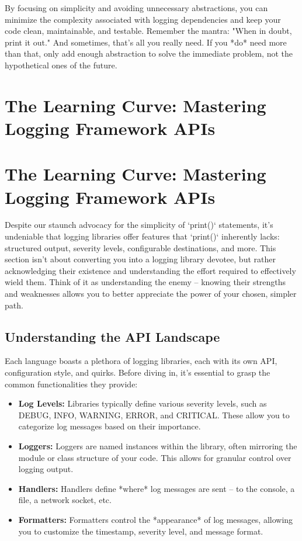 \documentclass{article}
\begin{document}
{{{{By focusing on simplicity and avoiding unnecessary abstractions, you can minimize the complexity associated with logging dependencies and keep your code clean, maintainable, and testable. Remember the mantra: "When in doubt, print it out." And sometimes, that's all you really need. If you *do* need more than that, only add enough abstraction to solve the immediate problem, not the hypothetical ones of the future.

\newpage

\section*{The Learning Curve: Mastering Logging Framework APIs} %
\label{chapter-7-5-The_Learning_Curve__Mastering_Logging_Fr}

\section*{The Learning Curve: Mastering Logging Framework APIs}

Despite our staunch advocacy for the simplicity of `print()` statements, it's undeniable that logging libraries offer features that `print()` inherently lacks: structured output, severity levels, configurable destinations, and more. This section isn't about converting you into a logging library devotee, but rather acknowledging their existence and understanding the effort required to effectively wield them. Think of it as understanding the enemy – knowing their strengths and weaknesses allows you to better appreciate the power of your chosen, simpler path.

\subsection*{Understanding the API Landscape}

Each language boasts a plethora of logging libraries, each with its own API, configuration style, and quirks. Before diving in, it's essential to grasp the common functionalities they provide:

\begin{itemize}
    \item \textbf{Log Levels:} Libraries typically define various severity levels, such as DEBUG, INFO, WARNING, ERROR, and CRITICAL.  These allow you to categorize log messages based on their importance.
    \item \textbf{Loggers:}  Loggers are named instances within the library, often mirroring the module or class structure of your code. This allows for granular control over logging output.
    \item \textbf{Handlers:} Handlers define *where* log messages are sent – to the console, a file, a network socket, etc.
    \item \textbf{Formatters:} Formatters control the *appearance* of log messages, allowing you to customize the timestamp, severity level, and message format.
\end{itemize}

}}}}
\end{document}
